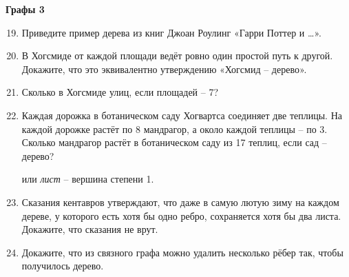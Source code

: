 \centerline{\bf \large Графы 3}
\begin{enumerate}
\setcounter{enumi}{18}
 -- связный граф без циклов.
\item Приведите пример дерева из книг Джоан Роулинг «Гарри Поттер и …».
\item В Хогсмиде от каждой площади ведёт ровно один простой путь к другой. Докажите, что это
эквивалентно утверждению «Хогсмид – дерево».
\item Сколько в Хогсмиде улиц, если площадей – 7?
\item Каждая дорожка в ботаническом саду Хогвартса соединяет две теплицы. На каждой дорожке
растёт по 8 мандрагор, а около каждой теплицы – по 3. Сколько мандрагор растёт в ботаническом саду
из 17 теплиц, если сад – дерево?

 или {\it лист} -- вершина степени 1.
\item Сказания кентавров утверждают, что даже в самую лютую зиму на каждом дереве, у которого есть
хотя бы одно ребро, сохраняется хотя бы два листа. Докажите, что сказания не врут.
\item Докажите, что из связного графа можно удалить несколько рёбер так, чтобы получилось дерево.


\end{enumerate}
